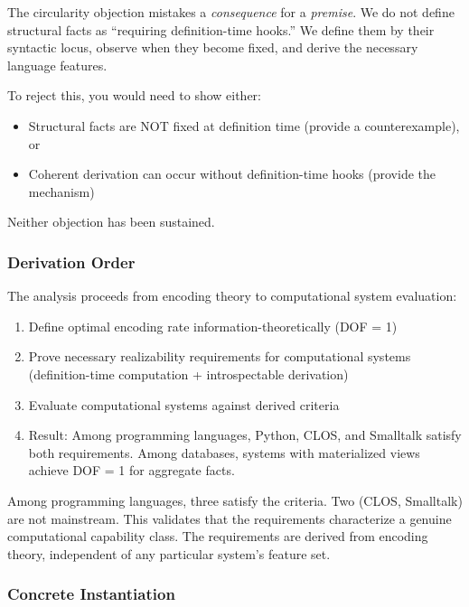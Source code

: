 The circularity objection mistakes a \emph{consequence} for a \emph{premise}. We do not define structural facts as ``requiring definition-time hooks.'' We define them by their syntactic locus, observe when they become fixed, and derive the necessary language features.

To reject this, you would need to show either:
\begin{itemize}
\tightlist
\item Structural facts are NOT fixed at definition time (provide a counterexample), or
\item Coherent derivation can occur without definition-time hooks (provide the mechanism)
\end{itemize}

Neither objection has been sustained.

\subsubsection{Derivation Order}

The analysis proceeds from encoding theory to computational system evaluation:

\begin{enumerate}
\item Define optimal encoding rate information-theoretically (DOF = 1)
\item Prove necessary realizability requirements for computational systems (definition-time computation + introspectable derivation)
\item Evaluate computational systems against derived criteria
\item Result: Among programming languages, Python, CLOS, and Smalltalk satisfy both requirements. Among databases, systems with materialized views achieve DOF = 1 for aggregate facts.
\end{enumerate}

Among programming languages, three satisfy the criteria. Two (CLOS, Smalltalk) are not mainstream. This validates that the requirements characterize a genuine computational capability class. The requirements are derived from encoding theory, independent of any particular system's feature set.


\subsubsection{Concrete Instantiation}

